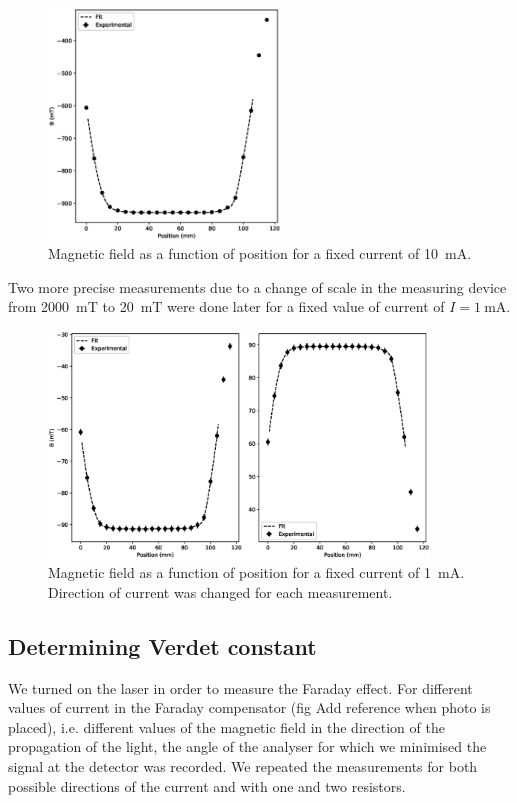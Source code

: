 \documentclass[11pt,a4paper]{article}
\begin{document}
\begin{figure}[H]
\centering
\includegraphics[width=0.55\textwidth]{B_diff_position1.eps}
\caption{Magnetic field as a function of position for a fixed current of \SI{10}{\mA}.}
\label{fig:BvsPos1}
\end{figure}

Two more precise measurements due to a change of scale in the measuring device from \SI{2000}{mT} to \SI{20}{mT} were done later for a fixed value of current of $I=\SI{1}{\mA}$.

\begin{figure}[H]
\centering
\includegraphics[width=0.9\textwidth]{B_diff_position2.eps}
\caption{Magnetic field as a function of position for a fixed current of \SI{1}{\mA}. Direction of current was changed for each measurement.}
\label{fig:BvsPos2}
\end{figure}

\subsection{Determining Verdet constant}

We turned on the laser in order to measure the Faraday effect. For different values of current in the Faraday compensator (fig {\color{red}Add reference when photo is placed}), i.e. different values of the magnetic field in the direction of the propagation of the light, the angle of the analyser for which we minimised the signal at the detector was recorded. We repeated the measurements for both possible directions of the current and with one and two resistors.
\end{document}
